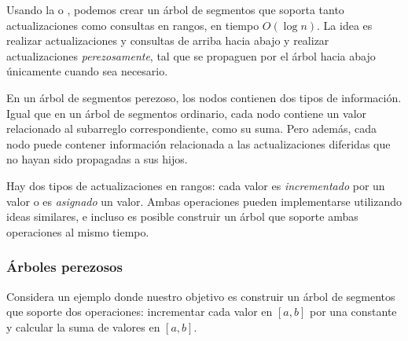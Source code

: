 Usando la  o , podemos crear un
árbol de segmentos que soporta tanto actualizaciones como consultas en
rangos, en tiempo $O(\log n)$. La idea es realizar actualizaciones y
consultas de arriba hacia abajo y realizar actualizaciones
\emph{perezosamente}, tal que se propaguen por el árbol hacia abajo
únicamente cuando sea necesario.

En un árbol de segmentos perezoso, los nodos contienen dos tipos de
información. Igual que en un árbol de segmentos ordinario, cada nodo contiene
un valor relacionado al subarreglo correspondiente, como su suma.
Pero además, cada nodo puede contener información relacionada a las
actualizaciones diferidas que no hayan sido propagadas a sus hijos.

Hay dos tipos de actualizaciones en rangos: cada valor es \emph{incrementado}
por un valor o es \emph{asignado} un valor. Ambas operaciones pueden
implementarse utilizando ideas similares, e incluso es posible construir un
árbol que soporte ambas operaciones al mismo tiempo.

\subsubsection{Árboles perezosos}

Considera un ejemplo donde nuestro objetivo es construir un árbol de
segmentos que soporte dos operaciones: incrementar cada valor en $[a,b]$ por
una constante y calcular la suma de valores en $[a,b]$.

